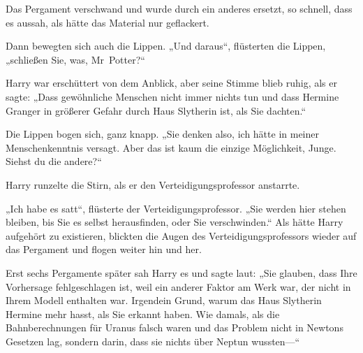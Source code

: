 Das Pergament verschwand und wurde durch ein anderes ersetzt, so schnell, dass es aussah, als hätte das Material nur geflackert.

Dann bewegten sich auch die Lippen. „Und daraus“, flüsterten die Lippen, „schließen Sie, was, Mr~Potter?“

Harry war erschüttert von dem Anblick, aber seine Stimme blieb ruhig, als er sagte: „Dass gewöhnliche Menschen nicht immer nichts tun und dass Hermine Granger in größerer Gefahr durch Haus Slytherin ist, als Sie dachten.“

Die Lippen bogen sich, ganz knapp. „Sie denken also, ich hätte in meiner Menschenkenntnis versagt. Aber das ist kaum die einzige Möglichkeit, Junge. Siehst du die andere?“

Harry runzelte die Stirn, als er den Verteidigungsprofessor anstarrte.

„Ich habe es satt“, flüsterte der Verteidigungsprofessor. „Sie werden hier stehen bleiben, bis Sie es selbst herausfinden, oder Sie verschwinden.“ Als hätte Harry aufgehört zu existieren, blickten die Augen des Verteidigungsprofessors wieder auf das Pergament und flogen weiter hin und her.

Erst sechs Pergamente später sah Harry es und sagte laut: „Sie glauben, dass Ihre Vorhersage fehlgeschlagen ist, weil ein anderer Faktor am Werk war, der nicht in Ihrem Modell enthalten war. Irgendein Grund, warum das Haus Slytherin Hermine mehr hasst, als Sie erkannt haben. Wie damals, als die Bahnberechnungen für Uranus falsch waren und das Problem nicht in Newtons Gesetzen lag, sondern darin, dass sie nichts über Neptun wussten—“


